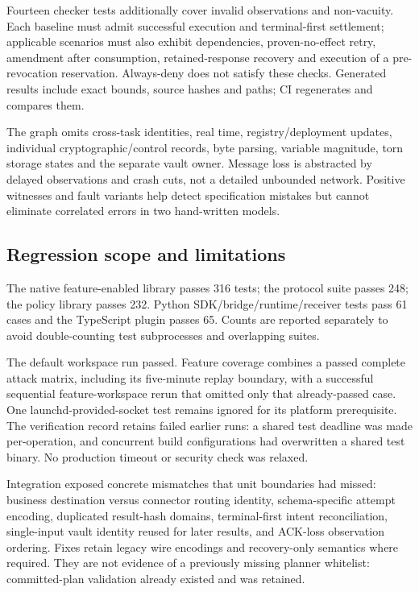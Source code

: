 \documentclass[letterpaper,twocolumn,10pt]{article}
\begin{document}
Fourteen checker tests additionally cover invalid observations and non-vacuity.
Each baseline must admit successful execution and terminal-first settlement;
applicable scenarios must also exhibit dependencies, proven-no-effect retry,
amendment after consumption, retained-response recovery and execution of a
pre-revocation reservation. Always-deny does not satisfy these checks.
Generated results include exact bounds, source hashes and paths; CI regenerates
and compares them.

The graph omits cross-task identities, real time, registry/deployment updates,
individual cryptographic/control records, byte parsing, variable magnitude,
torn storage states and the separate vault owner. Message loss is abstracted
by delayed observations and crash cuts, not a detailed unbounded network.
Positive witnesses and fault variants help detect specification mistakes but
cannot eliminate correlated errors in two hand-written models.

\subsection{Regression scope and limitations}

The native feature-enabled library passes 316 tests; the protocol suite passes
248; the policy library passes 232. Python SDK/bridge/runtime/receiver tests
pass 61 cases and the TypeScript plugin passes 65. Counts are reported separately
to avoid double-counting test subprocesses and overlapping suites.

The default workspace run passed. Feature coverage combines a passed complete
attack matrix, including its five-minute replay boundary, with a successful
sequential feature-workspace rerun that omitted only that already-passed case.
One launchd-provided-socket test remains ignored for its platform prerequisite.
The verification record retains failed earlier runs: a shared test deadline
was made per-operation, and concurrent build configurations had overwritten a
shared test binary. No production timeout or security check was relaxed.

Integration exposed concrete mismatches that unit boundaries had missed:
business destination versus connector routing identity, schema-specific attempt
encoding, duplicated result-hash domains, terminal-first intent reconciliation,
single-input vault identity reused for later results, and ACK-loss observation
ordering. Fixes retain legacy wire encodings and recovery-only semantics where
required. They are not evidence of a previously missing planner whitelist:
committed-plan validation already existed and was retained.
\end{document}
